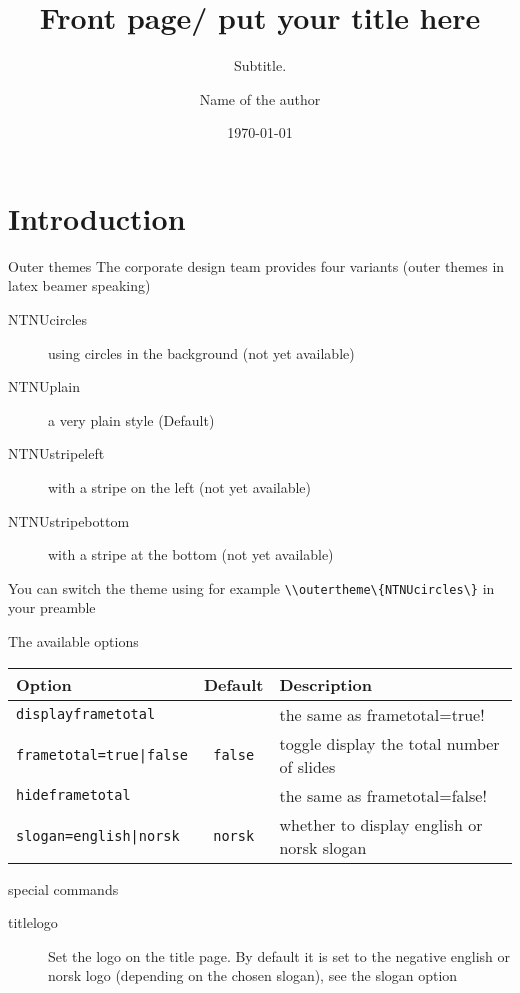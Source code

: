 \documentclass[aspectratio=169]{beamer}
\title[Your Short Title]{Front page/ put your title here}
\subtitle{Subtitle.}
\author{Name of the author}
\date{\today}
\begin{document}
	\maketitle
	\tableofcontents

	\section{Introduction}
	\begin{frame}{Outer themes}
		The corporate design team provides four variants (outer themes in latex beamer speaking)

		\begin{description}
			\item[NTNUcircles] using circles in the background (not yet available)
			\item[NTNUplain] a very plain style (Default)
			\item[NTNUstripeleft] with a stripe on the left (not yet available)
			\item[NTNUstripebottom] with a stripe at the bottom (not yet available)
		\end{description}

		You can switch the theme using for example
		\lstinline!\\outertheme\{NTNUcircles\}!
		in your preamble
	\end{frame}
	\begin{frame}[fragile]{The available options}
		\begin{tabular}{lcl}
			\toprule
			\textbf{Option} & \textbf{Default} &\textbf{Description} \\
			\midrule
			\lstinline!displayframetotal! && the same as \lstinline!!frametotal=true! \\
			\lstinline!frametotal=true|false! & \lstinline!false! & toggle display the total number of slides\\
			\lstinline!hideframetotal! && the same as \lstinline!!frametotal=false! \\
			\lstinline!slogan=english|norsk! & \lstinline!norsk! & whether to display english or norsk slogan\\
			\bottomrule
		\end{tabular}
	\end{frame}
	\begin{frame}{special commands}
		\begin{description}
			\item[titlelogo]
			Set the logo on the title page. By default it is set to the negative english or norsk logo (depending on the chosen slogan), see the slogan option
		\end{description}
	\end{frame}
\end{document}
